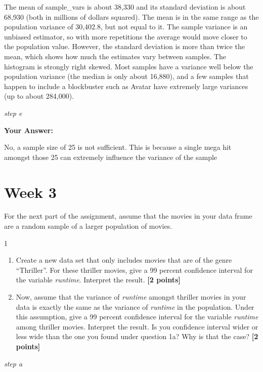 \documentclass[
]{article}
\providecommand{\tightlist}{%
  \setlength{\itemsep}{0pt}\setlength{\parskip}{0pt}}
\begin{document}
The mean of sample\_vars is about 38,330 and its standard deviation is
about 68,930 (both in millions of dollars squared). The mean is in the
same range as the population variance of 30,402.8, but not equal to it.
The sample variance is an unbiased estimator, so with more repetitions
the average would move closer to the population value. However, the
standard deviation is more than twice the mean, which shows how much the
estimates vary between samples. The histogram is strongly right skewed.
Most samples have a variance well below the population variance (the
median is only about 16,880), and a few samples that happen to include a
blockbuster such as Avatar have extremely large variances (up to about
284,000).

\emph{step e}

\textbf{Your Answer:}

No, a sample size of 25 is not sufficient. This is because a single mega
hit amongst those 25 can extremely influence the variance of the sample

\section{Week 3}\label{week-3}

For the next part of the assignment, assume that the movies in your data
frame are a random sample of a larger population of movies.

1

\begin{enumerate}
\def\labelenumi{\alph{enumi}.}
\tightlist
\item
  Create a new data set that only includes movies that are of the genre
  ``Thriller''. For these thriller movies, give a 99 percent confidence
  interval for the variable \emph{runtime}. Interpret the result.
  \textbf{[2 points]}
\item
  Now, assume that the variance of \emph{runtime} amongst thriller
  movies in your data is exactly the same as the variance of
  \emph{runtime} in the population. Under this assumption, give a 99
  percent confidence interval for the variable \emph{runtime} among
  thriller movies. Interpret the result. Is you confidence interval
  wider or less wide than the one you found under question 1a? Why is
  that the case? \textbf{[2 points]}
\end{enumerate}

\emph{step a}
\end{document}
